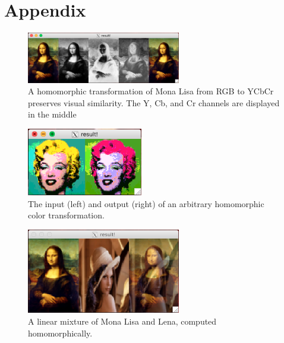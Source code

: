 \documentclass{article}
\begin{document}
    \newpage

    \nocite{*}
    
    {}

    \newpage

    \section{Appendix}

    \begin{figure}[h]
      \includegraphics[width=0.6\textwidth]{fig/RGB_to_YCbCr.png}
      \centering
      \caption{A homomorphic transformation of Mona Lisa from RGB to YCbCr preserves visual similarity.
      The Y, Cb, and Cr channels are displayed in the middle}
      \label{rgb_to_ycbcr}
    \end{figure}
    \begin{figure}[h]
      \includegraphics[width=0.45\textwidth]{fig/color_transform.png}
      \centering
      \caption{The input (left) and output (right) of an arbitrary homomorphic color transformation.}
      \label{color}
    \end{figure}
    \begin{figure}[h]
      \includegraphics[width=0.6\textwidth]{fig/mean.png}
      \centering
      \caption{A linear mixture of Mona Lisa and Lena, computed homomorphically.}
      \label{mean}
    \end{figure}
\end{document}
